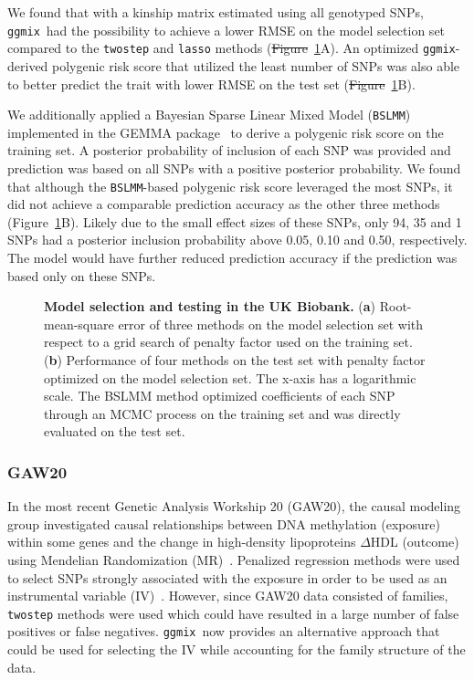 \documentclass[10pt,letterpaper]{article}
\newcommand{\ggmix}{\texttt{ggmix}}
\providecommand{\DIFaddtex}[1]{{\protect\color{blue}\uwave{#1}}} %
\providecommand{\DIFdeltex}[1]{{\protect\color{red}\sout{#1}}}                      %
\providecommand{\DIFaddbegin}{} %
\providecommand{\DIFaddend}{} %
\providecommand{\DIFdelbegin}{} %
\providecommand{\DIFdelend}{} %
\providecommand{\DIFadd}[1]{\texorpdfstring{\DIFaddtex{#1}}{#1}} %
\providecommand{\DIFdel}[1]{\texorpdfstring{\DIFdeltex{#1}}{}} %
\newcommand{\DIFscaledelfig}{0.5}
\newlength{\DIFdelgraphicswidth} %
\newlength{\DIFdelgraphicsheight} %
\newcommand{\DIFaddincludegraphics}[2][]{{\color{blue}\fbox{\DIFOincludegraphics[#1]{#2}}}} %
\newcommand{\DIFdelincludegraphics}[2][]{%
\sbox{\DIFdelgraphicsbox}{\DIFOincludegraphics[#1]{#2}}%
\settoboxwidth{\DIFdelgraphicswidth}{\DIFdelgraphicsbox} %
\settoboxtotalheight{\DIFdelgraphicsheight}{\DIFdelgraphicsbox} %
\scalebox{\DIFscaledelfig}{%
\parbox[b]{\DIFdelgraphicswidth}{\usebox{\DIFdelgraphicsbox}\\[-\baselineskip] \rule{\DIFdelgraphicswidth}{0em}}\llap{\resizebox{\DIFdelgraphicswidth}{\DIFdelgraphicsheight}{%
\setlength{\unitlength}{\DIFdelgraphicswidth}%
\begin{picture}(1,1)%
\thicklines\linethickness{2pt} %
{\color[rgb]{1,0,0}\put(0,0){\framebox(1,1){}}}%
{\color[rgb]{1,0,0}\put(0,0){\line( 1,1){1}}}%
{\color[rgb]{1,0,0}\put(0,1){\line(1,-1){1}}}%
\end{picture}%
}\hspace*{3pt}}} %
} %
\DeclareRobustCommand{\DIFaddbegin}{\DIFOaddbegin \let\includegraphics\DIFaddincludegraphics} %
\DeclareRobustCommand{\DIFaddend}{\DIFOaddend \let\includegraphics\DIFOincludegraphics} %
\DeclareRobustCommand{\DIFdelbegin}{\DIFOdelbegin \let\includegraphics\DIFdelincludegraphics} %
\DeclareRobustCommand{\DIFdelend}{\DIFOaddend \let\includegraphics\DIFOincludegraphics} %
\begin{document}
We found that with a kinship matrix estimated using all genotyped SNPs, \ggmix ~had the possibility to achieve a lower RMSE on the model selection set compared to the \texttt{twostep} and \texttt{lasso} methods (\DIFdelbegin \DIFdel{Figure}\DIFdelend \DIFaddbegin \DIFadd{Fig}\DIFaddend ~\ref{fig:UKB-Figure}A). An optimized \ggmix-derived polygenic risk score that utilized the least number of SNPs was also able to better predict the trait with lower RMSE on the test set (\DIFdelbegin \DIFdel{Figure}\DIFdelend \DIFaddbegin \DIFadd{Fig}\DIFaddend ~\ref{fig:UKB-Figure}B).

We additionally applied a Bayesian Sparse Linear Mixed Model (\texttt{BSLMM})~\cite{zhou2013polygenic} implemented in the GEMMA package~\cite{zhou2012genome} to derive a polygenic risk score on the training set. A posterior probability of inclusion of each SNP was provided and prediction was based on all SNPs with a positive posterior probability. We found that although the \texttt{BSLMM}-based polygenic risk score leveraged the most SNPs, it did not achieve a comparable prediction accuracy as the other three methods (Figure~\ref{fig:UKB-Figure}B). Likely due to the small effect sizes of these SNPs, only 94, 35 and 1 SNPs had a posterior inclusion probability above 0.05, 0.10 and 0.50, respectively. The model would have further reduced prediction accuracy if the prediction was based only on these SNPs.



\begin{figure}[!h]
	\caption{{\bf Model selection and testing in the UK Biobank.}
	({\bf a}) Root-mean-square error of three methods on the model selection set with respect to a grid search of penalty factor used on the training set. ({\bf b}) Performance of four methods on the test set with penalty factor optimized on the model selection set. The x-axis has a logarithmic scale. The BSLMM method optimized coefficients of each SNP through an MCMC process on the training set and was directly evaluated on the test set.}\label{fig:UKB-Figure}
\end{figure}








\subsubsection*{GAW20}

In the most recent Genetic Analysis Workship 20 (GAW20), the causal modeling group investigated causal relationships between DNA methylation (exposure) within some genes and the change in high-density lipoproteins $\Delta$HDL (outcome) using Mendelian Randomization (MR)~\cite{davey2003mendelian}.
Penalized regression methods were used to select SNPs strongly associated with the exposure in order to be used as an instrumental variable (IV)~\cite{cherlin2018using,zhou2018analysis}.
However, since GAW20 data consisted of families, \texttt{twostep} methods were used which could have resulted in a large number of false positives or false negatives. \ggmix~now provides an alternative approach that could be used for selecting the IV while accounting for the family structure of the data.
\end{document}
